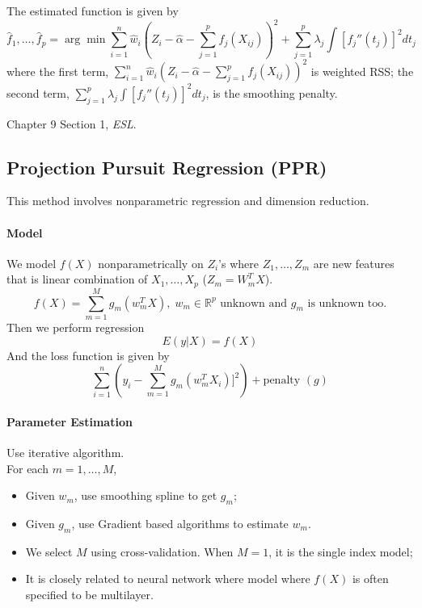 \documentclass[12pt]{book}
\theoremstyle{definition}
\theoremstyle{remark}
\newcommand{\R}{\mathbb{R}}
\begin{document}
The estimated function is given by
\[\hat{f}_1,\dots, \hat{f}_p = \arg\min \sum_{i=1}^n \hat{w}_i(Z_i - \hat{\alpha} -\sum_{j=1}^p f_j(X_{ij}))^2 + \sum_{j=1}^p \lambda_j \int [f_j''(t_j)]^2dt_j\]
where the first term, $\sum_{i=1}^n \hat{w}_i(Z_i - \hat{\alpha} -\sum_{j=1}^p f_j(X_{ij}))^2$ is weighted RSS; the second term, $\sum_{j=1}^p \lambda_j \int [f_j''(t_j)]^2dt_j$, is the smoothing penalty.

\begin{referencebox}
    Chapter 9 Section 1, \textit{ESL}.
\end{referencebox}

\subsection{Projection Pursuit Regression (PPR)}
This method involves nonparametric regression and dimension reduction.\\
\paragraph{Model}
We model $f(X)$ nonparametrically on $Z_i$'s where $Z_1,\dots, Z_m$ are new features that is linear combination of $X_1, \dots, X_p$ ($Z_m = W_m^TX$).
\[f(X) = \sum_{m=1}^M g_m(w_m^TX),\; w_m\in\R^p \text{ unknown and $g_m$ is unknown too.}\]
Then we perform regression
\[E(y|X) = f(X)\]
And the loss function is given by
\[\sum_{i=1}^n (y_i - \sum_{m=1}^Mg_m(w_m^TX_i)]^2)+\text{penalty }(g)\]

\paragraph{Parameter Estimation}
Use iterative algorithm.\\
For each $m = 1,\dots, M$,
\begin{itemize}
    \item Given $w_m$, use smoothing spline to get $g_m$;
    \item Given $g_m$, use Gradient based algorithms to estimate $w_m$.
\end{itemize}

\begin{notionbox}[Note]
    \begin{itemize}
        \item We select $M$ using cross-validation. When $M = 1$, it is the single index model;
        \item It is closely related to neural network where model where $f(X)$ is often specified to be multilayer.
    \end{itemize}
\end{notionbox} 
\end{document}
